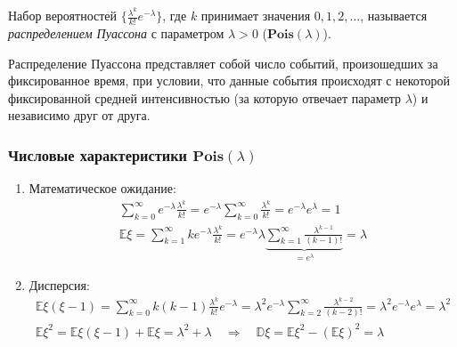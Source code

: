 \begin{defn}
    Набор вероятностей $\{\frac{\lambda^k}{k!} e^{-\lambda} \}$, где $k$ принимает значения $0, 1, 2, \ldots$, называется \textit{распределением Пуассона} с параметром $\lambda > 0$ ($\mathbf{Pois}(\lambda)$).
\end{defn}
\begin{rmrk}
    Распределение Пуассона представляет собой число событий, произошедших за фиксированное время, при условии, что данные события происходят с некоторой фиксированной средней интенсивностью (за которую отвечает параметр $\lambda$) и независимо друг от друга.
\end{rmrk}

\subsubsection{Числовые характеристики $\mathbf{Pois}(\lambda)$}
\begin{enumerate}
    \item Математическое ожидание:
    \begin{align*}
        \sum\limits_{k=0}^{\infty} e^{-\lambda} \frac{\lambda^k}{k!} = e^{-\lambda} \sum\limits_{k=0}^{\infty} \frac{\lambda^k}{k!} = e^{-\lambda} e^\lambda = 1 \\
        \mathbb{E}\xi = \sum\limits_{k=1}^{\infty} k e^{-\lambda} \frac{\lambda^k}{k!} = e^{-\lambda} \lambda \underbrace{\sum\limits_{k=1}^{\infty} \frac{\lambda^{k-1}}{(k - 1)!}}_{= e^\lambda} = \lambda
    \end{align*}
    \item Дисперсия:
    \begin{align*}
        \mathbb{E}\xi(\xi - 1) = \sum\limits_{k=0}^{\infty} k (k - 1) \frac{\lambda^k}{k!} e^{-\lambda}  = \lambda^2 e^{-\lambda} \sum\limits_{k=2}^{\infty} \frac{\lambda^{k-2}}{(k-2)!} = \lambda^2 e^{-\lambda} e^\lambda = \lambda^2 \\
        \mathbb{E}\xi^2 = \mathbb{E}\xi(\xi - 1) + \mathbb{E}\xi = \lambda^2 + \lambda \quad \Rightarrow \quad \mathbb{D}\xi = \mathbb{E}\xi^2 - (\mathbb{E}\xi)^2 = \lambda
    \end{align*}
\end{enumerate}